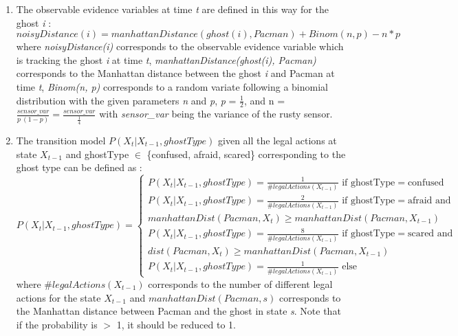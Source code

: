 \documentclass{article}
\begin{document}
\begin{enumerate}[label=\alph*.,leftmargin=*]
    \item The observable evidence variables at time \textit{t} are defined in
    this way for the ghost \textit{i} : \\
    
    $noisyDistance(i) = 
    manhattanDistance(ghost(i), Pacman) + Binom(n, p) - n * p$ \\

    where \textit{noisyDistance(i)} corresponds to the observable evidence variable 
    which is tracking the ghost \textit{i} at time \textit{t}, \textit{manhattanDistance(ghost(i), Pacman)}
    corresponds to the Manhattan distance between the ghost \textit{i} and Pacman at time \textit{t},
    \textit{Binom(n, p)} corresponds to a random variate following a binomial distribution with the given parameters
    \textit{n} and \textit{p}, \textit{p} = $\frac{1}{2}$, and n = $\frac{sensor\_var}{p \ (1 - p)} = \frac{sensor\_var}{\frac{1}{4}}$ with \textit{sensor\_var} being the variance of the rusty sensor.
    
    \item The transition model $P(X_t | X_{t - 1}, ghostType)$ given all the legal actions at state $X_{t - 1}$ and ghostType $\in$ \{confused, afraid, scared\} corresponding to the ghost type can be defined as :\\
    
    $
    P(X_t | X_{t - 1}, ghostType) = 
    \begin{cases}
        P(X_t | X_{t-1}, ghostType) =  \frac{1}{\#legalActions(X_{t-1})} \text{ if ghostType} = \text{confused} \\
        P(X_t | X_{t-1}, ghostType) = \frac{2}{\#legalActions(X_{t-1})} \text{ if ghostType} = \text{afraid and} \\ manhattanDist(Pacman, X_t) \geq  manhattanDist(Pacman, X_{t-1}) \\
        P(X_t | X_{t-1}, ghostType) = \frac{8}{\#legalActions(X_{t-1})} \text{ if ghostType} = \text{scared and} \\ dist(Pacman, X_t) \geq manhattanDist(Pacman, X_{t-1}) \\
        P(X_t | X_{t-1}, ghostType) = \frac{1}{\#legalActions(X_{t-1})} \text{ else}
    \end{cases}
    $\\

    where ${\#legalActions(X_{t-1})}$ corresponds to the number of different legal actions for the state $X_{t-1}$ and $manhattanDist(Pacman, s)$ 
    corresponds to the Manhattan distance between Pacman and the ghost in state \textit{s}. Note that if the probability is $>$ 1, it should be reduced to 1.

\end{enumerate}
\end{document}
